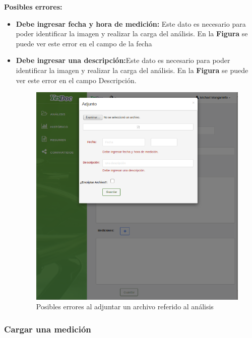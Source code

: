  	\textbf{Posibles errores:}
 	\begin{itemize}
 		\item \textbf{Debe ingresar fecha y hora de medición:} Este dato es necesario para poder identificar la imagen y realizar la carga del análisis. En la \textbf{Figura} se puede ver este error en el campo de la fecha
 		\item \textbf{Debe ingresar una descripción:}Este dato es necesario para poder identificar la imagen y realizar la carga del análisis. En la \textbf{Figura} se puede ver este error en el campo Descripción.
 		
 		\begin{figure}
 			\centering
 			\includegraphics[width=.8\textwidth]{img/manual_de_usuario/mu-adjuntar_archivo_error}
 			\caption{Posibles errores al adjuntar un archivo referido al análisis}
 			\label{mu-adjuntar_archivo_error}	
 		\end{figure}
 		
 		
 	\end{itemize}
 	
 	
 		
 	\subsubsection{Cargar una medición} 
 	
